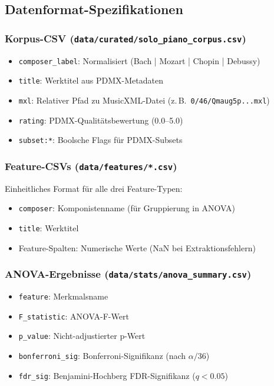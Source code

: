 \documentclass[10pt,a4paper]{article}
\theoremstyle{definition}
\begin{document}
\subsection{Datenformat-Spezifikationen}

\subsubsection{Korpus-CSV (\texttt{data/curated/solo\_piano\_corpus.csv})}
\begin{itemize}
    \item \texttt{composer\_label}: Normalisiert (Bach | Mozart | Chopin | Debussy)
    \item \texttt{title}: Werktitel aus PDMX-Metadaten
    \item \texttt{mxl}: Relativer Pfad zu MusicXML-Datei (z.\,B.\ \texttt{0/46/Qmaug5p...mxl})
    \item \texttt{rating}: PDMX-Qualitätsbewertung (0.0--5.0)
    \item \texttt{subset:*}: Boolsche Flags für PDMX-Subsets
\end{itemize}

\subsubsection{Feature-CSVs (\texttt{data/features/*.csv})}
Einheitliches Format für alle drei Feature-Typen:
\begin{itemize}
    \item \texttt{composer}: Komponistenname (für Gruppierung in ANOVA)
    \item \texttt{title}: Werktitel
    \item Feature-Spalten: Numerische Werte (NaN bei Extraktionsfehlern)
\end{itemize}

\subsubsection{ANOVA-Ergebnisse (\texttt{data/stats/anova\_summary.csv})}
\begin{itemize}
    \item \texttt{feature}: Merkmalsname
    \item \texttt{F\_statistic}: ANOVA-F-Wert
    \item \texttt{p\_value}: Nicht-adjustierter p-Wert
    \item \texttt{bonferroni\_sig}: Bonferroni-Signifikanz (nach $\alpha/36$)
    \item \texttt{fdr\_sig}: Benjamini-Hochberg FDR-Signifikanz ($q<0.05$)
\end{itemize}
\end{document}
